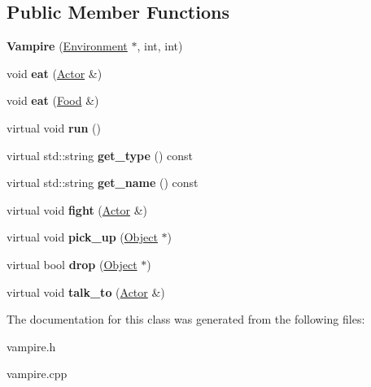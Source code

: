 \subsection*{Public Member Functions}
\begin{DoxyCompactItemize}
\item 
\hypertarget{classda__game_1_1Vampire_adfcf52e1ba7a0344f9d794c06a18da86}{
{\bfseries Vampire} (\hyperlink{classda__game_1_1Environment}{Environment} $\ast$, int, int)}
\label{classda__game_1_1Vampire_adfcf52e1ba7a0344f9d794c06a18da86}

\item 
\hypertarget{classda__game_1_1Vampire_a098285187dd2b419c4203fc871d41301}{
void {\bfseries eat} (\hyperlink{classda__game_1_1Actor}{Actor} \&)}
\label{classda__game_1_1Vampire_a098285187dd2b419c4203fc871d41301}

\item 
\hypertarget{classda__game_1_1Vampire_a67a45b375b34dcae9279f10a80c251cf}{
void {\bfseries eat} (\hyperlink{classda__game_1_1Food}{Food} \&)}
\label{classda__game_1_1Vampire_a67a45b375b34dcae9279f10a80c251cf}

\item 
\hypertarget{classda__game_1_1Vampire_aa026ac29df5be82f7305229780436621}{
virtual void {\bfseries run} ()}
\label{classda__game_1_1Vampire_aa026ac29df5be82f7305229780436621}

\item 
\hypertarget{classda__game_1_1Vampire_ae94c70e1a63a58ad3d5d77e4f0867200}{
virtual std::string {\bfseries get\_\-type} () const }
\label{classda__game_1_1Vampire_ae94c70e1a63a58ad3d5d77e4f0867200}

\item 
\hypertarget{classda__game_1_1Vampire_a461a139a2ba6c4f0714dc4824a132753}{
virtual std::string {\bfseries get\_\-name} () const }
\label{classda__game_1_1Vampire_a461a139a2ba6c4f0714dc4824a132753}

\item 
\hypertarget{classda__game_1_1Vampire_ab1826abb3ee4542d631e49241dbbb4cb}{
virtual void {\bfseries fight} (\hyperlink{classda__game_1_1Actor}{Actor} \&)}
\label{classda__game_1_1Vampire_ab1826abb3ee4542d631e49241dbbb4cb}

\item 
\hypertarget{classda__game_1_1Vampire_a94c6fce61816fed384b08da30c76ff63}{
virtual void {\bfseries pick\_\-up} (\hyperlink{classda__game_1_1Object}{Object} $\ast$)}
\label{classda__game_1_1Vampire_a94c6fce61816fed384b08da30c76ff63}

\item 
\hypertarget{classda__game_1_1Vampire_a49dcdd308b3e5a6865b4eb46c5d9f0fb}{
virtual bool {\bfseries drop} (\hyperlink{classda__game_1_1Object}{Object} $\ast$)}
\label{classda__game_1_1Vampire_a49dcdd308b3e5a6865b4eb46c5d9f0fb}

\item 
\hypertarget{classda__game_1_1Vampire_ae435892f6850a3e3fab698e35203149c}{
virtual void {\bfseries talk\_\-to} (\hyperlink{classda__game_1_1Actor}{Actor} \&)}
\label{classda__game_1_1Vampire_ae435892f6850a3e3fab698e35203149c}

\end{DoxyCompactItemize}


The documentation for this class was generated from the following files:\begin{DoxyCompactItemize}
\item 
vampire.h\item 
vampire.cpp\end{DoxyCompactItemize}
